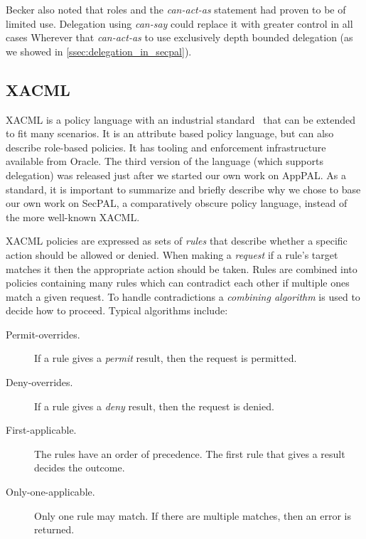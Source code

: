 \documentclass[thesis.tex]{subfiles}
\begin{document}
Becker also noted that roles and the \emph{can-act-as} statement had proven to
be of limited use. Delegation using \emph{can-say} could replace it with greater
control in all cases Wherever that \emph{can-act-as} to use exclusively depth
bounded delegation (as we showed in \autoref{ssec:delegation_in_secpal}). 


\subsection{XACML}

XACML is a policy language with an industrial
standard~\cite{oasis_extensible_2013} that can be extended to fit many
scenarios. It is an attribute based policy language, but can also describe
role-based policies. It has tooling and enforcement infrastructure available
from Oracle.  The third version of the language (which supports delegation) was
released just after we started our own work on AppPAL.
%
As a standard, it is important to summarize and briefly describe
why we chose to base our own work on SecPAL, a comparatively obscure policy
language, instead of the more well-known XACML.

XACML policies are expressed as sets of \emph{rules} that describe whether a
specific action should be allowed or denied. When making a \emph{request} if a
rule's target matches it then the appropriate action should be taken. Rules are
combined into policies containing many rules which can contradict each other if
multiple ones match a given request. To handle contradictions a \emph{combining
algorithm} is used to decide how to proceed. Typical algorithms include:

\begin{description}
  \item[Permit-overrides.] If a rule gives a \emph{permit} result, then the request is permitted.
  \item[Deny-overrides.] If a rule gives a \emph{deny} result, then the request is denied.
  \item[First-applicable.] The rules have an order of precedence. The first rule that gives a result decides the outcome.
  \item[Only-one-applicable.] Only one rule may match. If there are multiple matches, then an error is returned.
\end{description}
\end{document}
